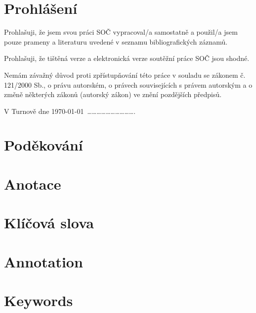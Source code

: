 \documentclass[a4paper, 12pt]{article}
\begin{document}
  \vspace{4em}

  \newpage

  \section*{\normalfont\textbf{Prohlášení}}
  Prohlašuji, že jsem svou práci SOČ vypracoval/a samostatně a použil/a jsem pouze prameny a literaturu uvedené v seznamu bibliografických záznamů.

  Prohlašuji, že tištěná verze a elektronická verze soutěžní práce SOČ jsou shodné.

  Nemám závažný důvod proti zpřístupňování této práce v souladu se zákonem č. 121/2000 Sb., o právu autorském, o právech souvisejících s právem autorským a o změně některých zákonů (autorský zákon) ve znění pozdějších předpisů.

  \qquad

  V Turnově dne \today \, ………………………….\\%

  \newpage

  \section*{\normalfont\textbf{Poděkování}}

  \newpage

  \section*{\normalfont\textbf{Anotace}}
  \section*{\normalfont\textbf{Klíčová slova}}
  \section*{\normalfont\textbf{Annotation}}
  \section*{\normalfont\textbf{Keywords}}

  \newpage

  \setcounter{savepage}{\value{page}}%
\end{document}
